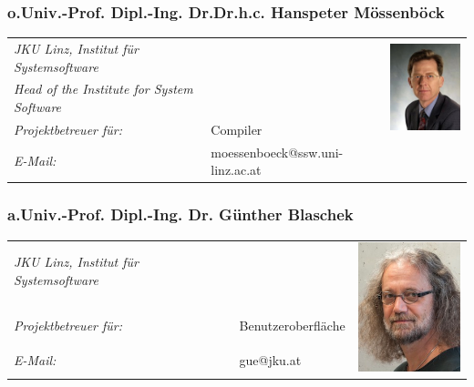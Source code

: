 \subsubsection*{o.Univ.-Prof. Dipl.-Ing. Dr.Dr.h.c. Hanspeter Mössenböck}
\renewcommand{\arraystretch}{1.2}
\begin{tabularx}{1\textwidth}{@{} l X l @{}}

\emph{JKU Linz, Institut für Systemsoftware}&&
\multirow{3}{2.5cm}{\includegraphics[width=3cm]{./media/images/project_team/Moessenboeck.png}
} 
\\
\emph{Head of the Institute for System Software} && \\
\emph{Projektbetreuer für:} & Compiler & \\
\emph{E-Mail:} & moessenboeck@ssw.uni-linz.ac.at & \\
\end{tabularx}

\subsubsection*{a.Univ.-Prof. Dipl.-Ing. Dr. Günther Blaschek}
\renewcommand{\arraystretch}{1.2}
\begin{tabularx}{1\textwidth}{@{} l X l @{}}

\emph{JKU Linz, Institut für Systemsoftware}&&
\multirow{5}{2.5cm}{\includegraphics[width=3cm]{./media/images/project_team/Blaschek.png}
} 
\\
&& \\
\emph{Projektbetreuer für:} & Benutzeroberfläche & \\
\emph{E-Mail:} & gue@jku.at & \\
\end{tabularx}

